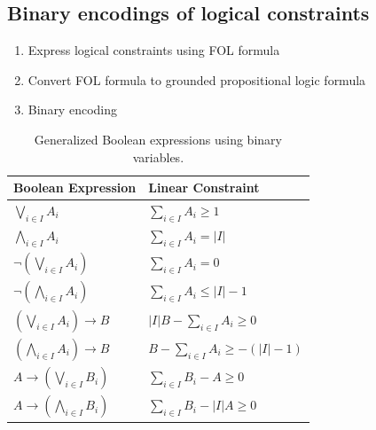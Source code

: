 \documentclass[10pt]{article}
\theoremstyle{definition}
\begin{document}
\subsection{Binary encodings of logical constraints}
\begin{enumerate}
  \item Express logical constraints using FOL formula
  \item Convert FOL formula to grounded propositional logic formula
  \item Binary encoding
\end{enumerate}
\begin{table}[H]
\centering

\begin{tabular}{l l}
\hline
\textbf{Boolean Expression} & \textbf{Linear Constraint} \\
\hline

$\displaystyle \bigvee_{i\in I} A_i$
&
$\displaystyle \sum_{i\in I} A_i \ge 1$
\\[6pt]

$\displaystyle \bigwedge_{i\in I} A_i$
&
$\displaystyle \sum_{i\in I} A_i = |I|$
\\[6pt]

$\displaystyle \neg\left(\bigvee_{i\in I} A_i\right)$
&
$\displaystyle \sum_{i\in I} A_i = 0$
\\[6pt]

$\displaystyle \neg\left(\bigwedge_{i\in I} A_i\right)$
&
$\displaystyle \sum_{i\in I} A_i \le |I|-1$
\\[6pt]

$\displaystyle
\left(\bigvee_{i\in I} A_i\right)\rightarrow B$
&
$\displaystyle
|I|B-\sum_{i\in I}A_i \ge 0$
\\[6pt]

$\displaystyle
\left(\bigwedge_{i\in I} A_i\right)\rightarrow B$
&
$\displaystyle
B-\sum_{i\in I}A_i \ge -( |I|-1)$
\\[6pt]

$\displaystyle
A\rightarrow\left(\bigvee_{i\in I}B_i\right)$
&
$\displaystyle
\sum_{i\in I}B_i-A\ge0$
\\[6pt]

$\displaystyle
A\rightarrow\left(\bigwedge_{i\in I}B_i\right)$
&
$\displaystyle
\sum_{i\in I}B_i-|I|A\ge0$
\\

\hline
\end{tabular}

\caption{Generalized Boolean expressions using binary variables.}
\end{table}
\end{document}
